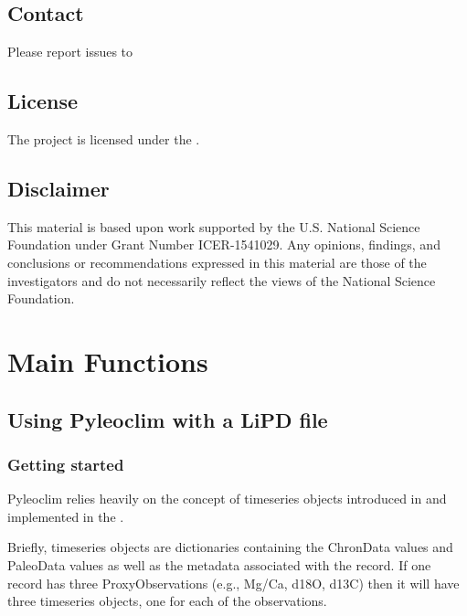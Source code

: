 \documentclass[letterpaper,10pt,english]{sphinxmanual}
\begin{document}
\section{Contact}
\label{\detokenize{Introduction:contact}}
Please report issues to 


\section{License}
\label{\detokenize{Introduction:license}}
The project is licensed under the  .


\section{Disclaimer}
\label{\detokenize{Introduction:disclaimer}}
This material is based upon work supported by the U.S. National Science Foundation under Grant Number
ICER-1541029. Any opinions, findings, and conclusions or recommendations expressed in this material are those
of the investigators and do not necessarily reflect the views of the National Science Foundation.


\chapter{Main Functions}
\label{\detokenize{Main:main-functions}}\label{\detokenize{Main::doc}}

\section{Using Pyleoclim with a LiPD file}
\label{\detokenize{Main:using-pyleoclim-with-a-lipd-file}}

\subsection{Getting started}
\label{\detokenize{Main:getting-started}}
Pyleoclim relies heavily on the concept of timeseries objects introduced in
 and implemented in the
.

Briefly, timeseries objects are dictionaries containing the ChronData values and
PaleoData values as well as the metadata associated with the record. If one record
has three ProxyObservations (e.g., Mg/Ca, d18O, d13C) then it will have three timeseries
objects, one for each of the observations.
\end{document}

